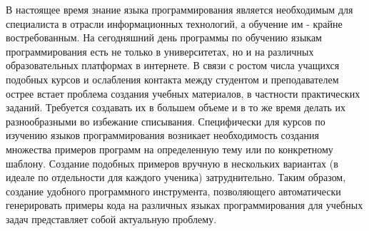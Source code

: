 
В настоящее время знание языка программирования является необходимым для специалиста в отрасли 
информационных технологий, а обучение им - крайне востребованным. 
На сегодняшний день программы по обучению языкам программирования есть не только в университетах,
но и на различных образовательных платформах в интернете.
В связи с ростом числа учащихся подобных курсов и ослабления контакта между студентом и
преподавателем острее встает проблема создания учебных материалов, в частности практических
заданий. Требуется создавать их в большем объеме и в то же время делать их разнообразными
во избежание списывания. Специфически для курсов по изучению языков программирования возникает
необходимость создания множества примеров программ на определенную тему или по конкретному
шаблону. Создание подобных примеров вручную в нескольких вариантах 
(в идеале по отдельности для каждого ученика) затруднительно.
Таким образом, создание удобного программного инструмента,
позволяющего автоматически генерировать примеры кода на различных языках программирования
для учебных задач представляет собой актуальную проблему.
